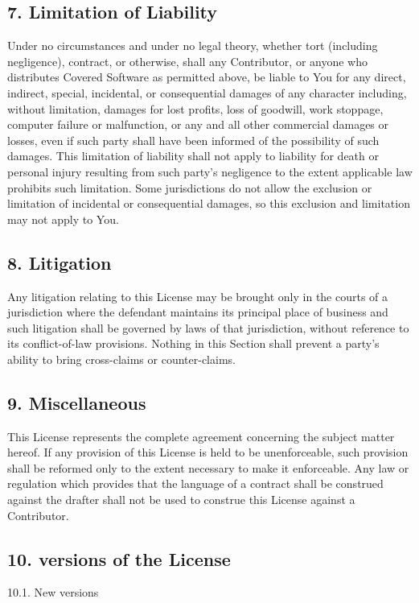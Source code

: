 \documentclass[letterpaper,10pt,openany,oneside,english]{sphinxmanual}
\begin{document}
\subsection{7. Limitation of Liability}
\label{\detokenize{warranty:limitation-of-liability}}
Under no circumstances and under no legal theory, whether tort (including negligence), contract, or otherwise, shall any Contributor, or anyone who distributes Covered Software as permitted above, be liable to You for any direct, indirect, special, incidental, or consequential damages of any character including, without limitation, damages for lost profits, loss of goodwill, work stoppage, computer failure or malfunction, or any and all other commercial damages or losses, even if such party shall have been informed of the possibility of such damages. This limitation of liability shall not apply to liability for death or personal injury resulting from such party’s negligence to the extent applicable law prohibits such limitation. Some jurisdictions do not allow the exclusion or limitation of incidental or consequential damages, so this exclusion and limitation may not apply to You.


\subsection{8. Litigation}
\label{\detokenize{warranty:litigation}}
Any litigation relating to this License may be brought only in the courts of a jurisdiction where the defendant maintains its principal place of business and such litigation shall be governed by laws of that jurisdiction, without reference to its conflict-of-law provisions. Nothing in this Section shall prevent a party’s ability to bring cross-claims or counter-claims.


\subsection{9. Miscellaneous}
\label{\detokenize{warranty:miscellaneous}}
This License represents the complete agreement concerning the subject matter hereof. If any provision of this License is held to be unenforceable, such provision shall be reformed only to the extent necessary to make it enforceable. Any law or regulation which provides that the language of a contract shall be construed against the drafter shall not be used to construe this License against a Contributor.


\subsection{10. versions of the License}
\label{\detokenize{warranty:versions-of-the-license}}
10.1. New versions
\end{document}
